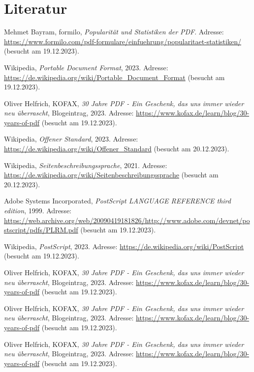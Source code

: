 \chapter*{Literatur}
\label{chap:literature}
%
\begin{referenceslist}
	\item Mehmet Bayram, formilo, \emph{Popularität und Statistiken der PDF}. Adresse: \url{https://www.formilo.com/pdf-formulare/einfuehrung/popularitaet-statistiken/} (besucht am 19.12.2023).
	
	\itema Wikipedia, \emph{Portable Document Format}, 2023. Adresse: \url{https://de.wikipedia.org/wiki/Portable_Document_Format} (besucht am 19.12.2023).
	
	\itemb Oliver Helfrich, KOFAX, \emph{30 Jahre PDF - Ein Geschenk, das uns immer wieder neu überrascht}, Blogeintrag, 2023. Adresse: \url{https://www.kofax.de/learn/blog/30-years-of-pdf} (besucht am 19.12.2023).
	
	\itemc Wikipedia, \emph{Offener Standard}, 2023. Adresse: \url{https://de.wikipedia.org/wiki/Offener_Standard} (besucht am 20.12.2023).
	
	\itemd Wikipedia, \emph{Seitenbeschreibungssprache}, 2021. Adresse: \url{https://de.wikipedia.org/wiki/Seitenbeschreibungssprache} (besucht am 20.12.2023). 
	
	\iteme Adobe Systems Incorporated, \emph{PostScript LANGUAGE REFERENCE third edition}, 1999. Adresse: \url{https://web.archive.org/web/20090419181826/http://www.adobe.com/devnet/postscript/pdfs/PLRM.pdf} (besucht am 19.12.2023).
	
	\iteme Wikipedia, \emph{PostScript}, 2023. Adresse: \url{https://de.wikipedia.org/wiki/PostScript} (besucht am 19.12.2023).
	
	\itemf Oliver Helfrich, KOFAX, \emph{30 Jahre PDF - Ein Geschenk, das uns immer wieder neu überrascht}, Blogeintrag, 2023. Adresse: \url{https://www.kofax.de/learn/blog/30-years-of-pdf} (besucht am 19.12.2023).
	
	\itemg Oliver Helfrich, KOFAX, \emph{30 Jahre PDF - Ein Geschenk, das uns immer wieder neu überrascht}, Blogeintrag, 2023. Adresse: \url{https://www.kofax.de/learn/blog/30-years-of-pdf} (besucht am 19.12.2023).
	
	\itemh Oliver Helfrich, KOFAX, \emph{30 Jahre PDF - Ein Geschenk, das uns immer wieder neu überrascht}, Blogeintrag, 2023. Adresse: \url{https://www.kofax.de/learn/blog/30-years-of-pdf} (besucht am 19.12.2023).
	

\end{referenceslist}
